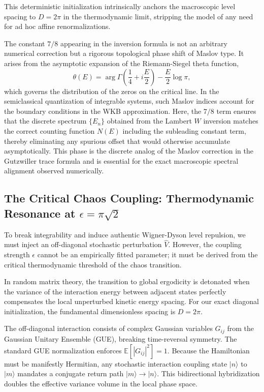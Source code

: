 \documentclass[aps,prl,preprint,superscriptaddress,floatfix]{revtex4-2}
\begin{document}
This deterministic initialization intrinsically anchors the macroscopic level spacing to $D = 2\pi$ in the thermodynamic limit, stripping the model of any need for ad hoc affine renormalizations.

The constant $7/8$ appearing in the inversion formula is not an arbitrary numerical correction but a rigorous topological phase shift of Maslov type. It arises from the asymptotic expansion of the Riemann-Siegel theta function,
\begin{equation}
\theta(E) = \arg\Gamma\left(\frac14 + i\frac{E}{2}\right) - \frac{E}{2}\log\pi,
\end{equation}
which governs the distribution of the zeros on the critical line. In the semiclassical quantization of integrable systems, such Maslov indices account for the boundary conditions in the WKB approximation. Here, the $7/8$ term ensures that the discrete spectrum $\{E_n\}$ obtained from the Lambert $W$ inversion matches the correct counting function $N(E)$ including the subleading constant term, thereby eliminating any spurious offset that would otherwise accumulate asymptotically. This phase is the discrete analog of the Maslov correction in the Gutzwiller trace formula and is essential for the exact macroscopic spectral alignment observed numerically.

\subsection{The Critical Chaos Coupling: Thermodynamic Resonance at \texorpdfstring{$\epsilon = \pi \sqrt{2}$}{epsilon = pi sqrt(2)}}

To break integrability and induce authentic Wigner-Dyson level repulsion, we must inject an off-diagonal stochastic perturbation $\hat{V}$. However, the coupling strength $\epsilon$ cannot be an empirically fitted parameter; it must be derived from the critical thermodynamic threshold of the chaos transition.

In random matrix theory, the transition to global ergodicity is detonated when the variance of the interaction energy between adjacent states perfectly compensates the local unperturbed kinetic energy spacing. For our exact diagonal initialization, the fundamental dimensionless spacing is $D = 2\pi$.

The off-diagonal interaction consists of complex Gaussian variables $G_{ij}$ from the Gaussian Unitary Ensemble (GUE), breaking time-reversal symmetry. The standard GUE normalization enforces $\mathbb{E}[|G_{ij}|^2] = 1$. Because the Hamiltonian must be manifestly Hermitian, any stochastic interaction coupling state $|n\rangle$ to $|m\rangle$ mandates a conjugate return path $|m\rangle \to |n\rangle$. This bidirectional hybridization doubles the effective variance volume in the local phase space. 
\end{document}
